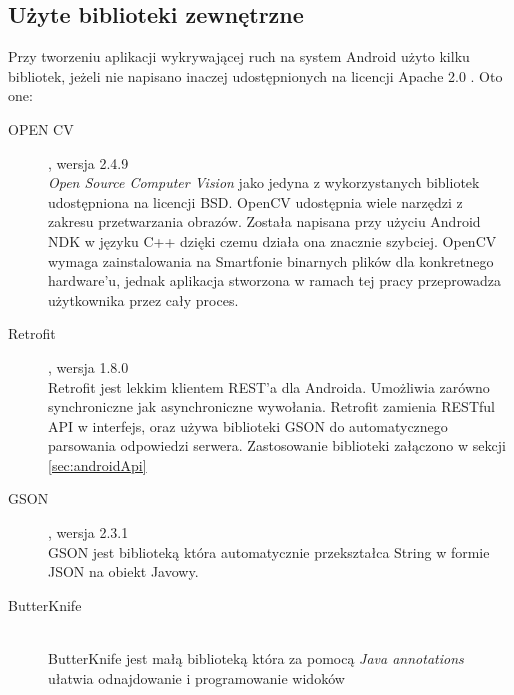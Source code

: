 \FloatBarrier
\subsection{Użyte biblioteki zewnętrzne}
\label{sec:biblioteki zewnętrzne}

Przy tworzeniu aplikacji wykrywającej ruch na system Android użyto kilku bibliotek, jeżeli nie napisano inaczej udostępnionych na licencji Apache 2.0 \cite{Apachelicense}. Oto one:

\begin{description}
	\item[OPEN CV] \cite{Opencv}, wersja 2.4.9 \hfil \\
	{\it Open Source Computer Vision} jako jedyna z wykorzystanych bibliotek udostępniona na licencji BSD. OpenCV udostępnia wiele narzędzi z zakresu przetwarzania obrazów. Została napisana przy użyciu Android NDK w języku C++ dzięki czemu działa ona znacznie szybciej. OpenCV wymaga zainstalowania na Smartfonie binarnych plików dla konkretnego hardware'u, jednak aplikacja stworzona w ramach tej pracy przeprowadza użytkownika przez cały proces. 
	
	\item[Retrofit] \cite{Retrofit}, wersja 1.8.0 \hfil \\
	Retrofit jest lekkim klientem REST'a dla Androida. Umożliwia zarówno synchroniczne jak asynchroniczne wywołania. Retrofit zamienia RESTful API w interfejs, oraz używa biblioteki GSON do automatycznego parsowania odpowiedzi serwera. Zastosowanie biblioteki załączono w sekcji \ref{sec:androidApi}
	
	\item[GSON] \cite{Gson}, wersja 2.3.1 \hfil \\
	GSON jest biblioteką która automatycznie przekształca String w formie JSON \cite{Json} na obiekt Javowy.
	
	\item[ButterKnife] \cite{Butterknife} \hfil \\
	ButterKnife jest małą biblioteką która za pomocą {\it Java annotations} ułatwia odnajdowanie i programowanie widoków 

\end{description}


